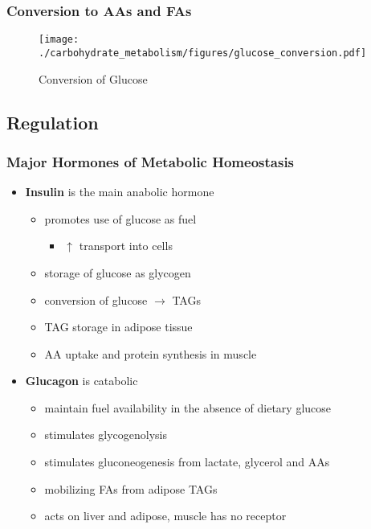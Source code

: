 \documentclass{scrartcl}
\begin{document}
\subsubsection{Conversion to AAs and FAs}
\label{sec:orge889ca7}

\begin{figure}[htbp]
\centering
\texttt{[image: ./carbohydrate\_metabolism/figures/glucose\_conversion.pdf]}
\caption{\label{fig:org063e55a}
Conversion of Glucose}
\end{figure}

\subsection{Regulation}
\label{sec:org2396398}
\subsubsection{Major Hormones of Metabolic Homeostasis}
\label{sec:orgf3c217a}
\begin{itemize}
\item \textbf{Insulin} is the main anabolic hormone
\begin{itemize}
\item promotes use of glucose as fuel
\begin{itemize}
\item \(\uparrow\) transport into cells
\end{itemize}
\item storage of glucose as glycogen
\item conversion of glucose \(\to\) TAGs
\item TAG storage in adipose tissue
\item AA uptake and protein synthesis in muscle
\end{itemize}
\item \textbf{Glucagon} is catabolic
\begin{itemize}
\item maintain fuel availability in the absence of dietary glucose
\item stimulates glycogenolysis
\item stimulates gluconeogenesis from lactate, glycerol and AAs
\item mobilizing FAs from adipose TAGs
\item acts on liver and adipose, muscle has no receptor
\end{itemize}
\end{itemize}
\end{document}
